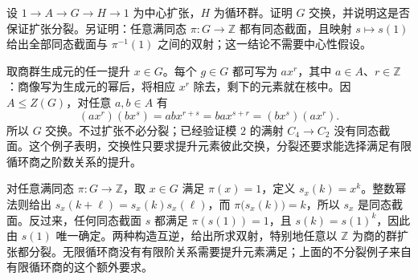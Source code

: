 \begin{exercise}\label{b1:ex:06-8}
	设 \(1\rightarrow A\rightarrow G\rightarrow H\rightarrow1\) 为中心扩张，\(H\) 为循环群。证明 \(G\) 交换，并说明这是否保证扩张分裂。另证明：任意满同态 \(\pi:G\rightarrow\mathbb Z\) 都有同态截面，且映射 \(s\mapsto s(1)\) 给出全部同态截面与 \(\pi^{-1}(1)\) 之间的双射；这一结论不需要中心性假设。
\end{exercise}
\begin{solution}
	取商群生成元的任一提升 \(x\in G\)。每个 \(g\in G\) 都可写为 \(ax^r\)，其中 \(a\in A\)、\(r\in\mathbb Z\)：商像写为生成元的幂后，将相应 \(x^r\) 除去，剩下的元素就在核中。因 \(A\leq Z(G)\)，对任意 \(a,b\in A\) 有
	\[
		(ax^r)(bx^s)=abx^{r+s}=bax^{s+r}=(bx^s)(ax^r).
	\]
	所以 \(G\) 交换。不过扩张不必分裂；已经验证模 \(2\) 的满射 \(C_4\rightarrow C_2\) 没有同态截面。这个例子表明，交换性只要求提升元素彼此交换，分裂还要求能选择满足有限循环商之阶数关系的提升。

	对任意满同态 \(\pi:G\rightarrow\mathbb Z\)，取 \(x\in G\) 满足 \(\pi(x)=1\)，定义 \(s_x(k)=x^k\)。整数幂法则给出 \(s_x(k+\ell)=s_x(k)s_x(\ell)\)，而 \(\pi\bigl(s_x(k)\bigr)=k\)，所以 \(s_x\) 是同态截面。反过来，任何同态截面 \(s\) 都满足 \(\pi(s(1))=1\)，且 \(s(k)=s(1)^k\)，因此由 \(s(1)\) 唯一确定。两种构造互逆，给出所求双射，特别地任意以 \(\mathbb Z\) 为商的群扩张都分裂。无限循环商没有有限阶关系需要提升元素满足；上面的不分裂例子来自有限循环商的这个额外要求。
\end{solution}

